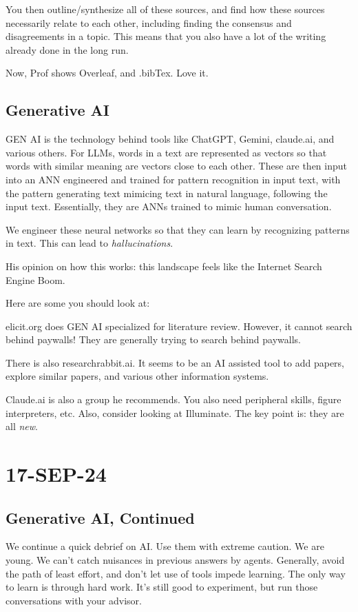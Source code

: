 \documentclass[10pt, oneside]{article}
\begin{document}
You then outline/synthesize all of these sources, and find how these sources necessarily relate to each other, including finding the consensus and disagreements in a topic. This means that you also have a lot of the writing already done in the long run. 

Now, Prof shows Overleaf, and .bibTex. Love it. 

\subsection{Generative AI}
GEN AI is the technology behind tools like ChatGPT, Gemini, claude.ai, and various others. 
For LLMs, words in a text are represented as vectors so that words with similar meaning are vectors close to each other. These are then input into an ANN engineered and trained for pattern recognition in input text, with the pattern generating text mimicing text in natural language, following the input text. Essentially, they are ANNs trained to mimic human conversation. 

We engineer these neural networks so that they can learn by recognizing patterns in text. This can lead to \textit{hallucinations}. 

His opinion on how this works: this landscape feels like the Internet Search Engine Boom. 

Here are some you should look at:

elicit.org does GEN AI specialized for literature review. However, it cannot search behind paywalls! They are generally trying to search behind paywalls. 

There is also researchrabbit.ai. It seems to be an AI assisted tool to add papers, explore similar papers, and various other information systems. 

Claude.ai is also a group he recommends. You also need peripheral skills, figure interpreters, etc. Also, consider looking at Illuminate. The key point is: they are all \textit{new}. 
\section{17-SEP-24}
\subsection{Generative AI, Continued}
We continue a quick debrief on AI. Use them with extreme caution. We are young. We can't catch nuisances in previous answers by agents. Generally, avoid the path of least effort, and don't let use of tools impede learning. The only way to learn is through hard work. It's still good to experiment, but run those conversations with your advisor. 
\end{document}
